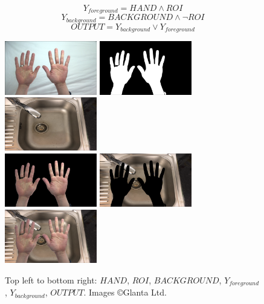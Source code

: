             \[ Y_{foreground} = HAND \land ROI \]
            \[ Y_{background} = BACKGROUND \land \lnot ROI \]
            \[ OUTPUT = Y_{background} \lor Y_{foreground} \]

            \begin{figure}[h]
                \centering
                \includegraphics[width=114pt]{../img/handspipeline/1.png}
                \includegraphics[width=114pt]{../img/handspipeline/2.png}
                \includegraphics[width=114pt]{../img/handspipeline/3.png}\\
                \includegraphics[width=114pt]{../img/handspipeline/4.png}
                \includegraphics[width=114pt]{../img/handspipeline/5.png}
                \includegraphics[width=114pt]{../img/handspipeline/6.png}
                \caption{Top left to bottom right: $HAND$, $ROI$, $BACKGROUND$, $Y_{foreground}$, $Y_{background}$, $OUTPUT$. Images \copyright \space Glanta Ltd.}
            \end{figure}

